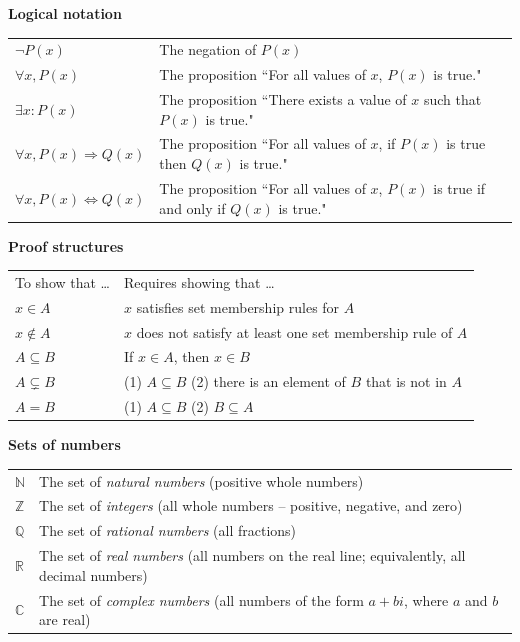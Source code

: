 \documentclass[11pt]{article}
\newcommand{\R}{\mathbb{R}}
\newcommand{\C}{\mathbb{C}}
\newcommand{\Q}{\mathbb{Q}}
\newcommand{\N}{\mathbb{N}}
\newcommand{\Z}{\mathbb{Z}}
\renewcommand\subset\subseteq
\theoremstyle{definition}
\begin{document}
\vfill 
{\bf Logical notation}

\begin{tabular}{L{1in}L{5in}}
$\neg P(x)$ & The negation of $P(x)$ \\

$\forall x, P(x)$ & The proposition ``For all values of $x$, $P(x)$ is true." \\

$\exists x: P(x)$ & The proposition ``There exists a value of $x$ such that $P(x)$ is true." \\

$\forall x, P(x) \Rightarrow Q(x)$ & The proposition ``For all values of $x$, if $P(x)$ is true then $Q(x)$ is true."\\

$\forall x, P(x) \Leftrightarrow Q(x)$ & The proposition ``For all values of $x$, $P(x)$ is true if and only if $Q(x)$ is true." 
\end{tabular}


\vfill
{\bf Proof structures}

\begin{tabular}{L{1in}L{5in}}
To show that \dots & Requires showing that \dots \\
{\bf $x\in A$} & $x$ satisfies set membership rules for $A$ \\
{\bf $x\notin A$} & $x$ does not satisfy at least one set membership rule of $A$ \\ 
{\bf $A\subset B$} & If $x\in A$, then $x\in B$ \\ 
{\bf $A\subsetneq B$} & (1) $A\subset B$ \quad (2) there is an element of $B$ that is not in $A$ \\ 
{\bf $A=B$} & (1) $A\subset B$ \quad (2) $B\subset A$
\end{tabular}

\vfill 

{\bf Sets of numbers}

\begin{tabular}{ll}
$\N$ & The set of {\em natural numbers} (positive whole numbers) \\
$\Z$ & The set of {\em integers} (all whole numbers -- positive, negative, and zero) \\
$\Q$ & The set of {\em rational numbers} (all fractions) \\
$\R$ & The set of {\em real numbers} (all numbers on the real line; equivalently, all decimal numbers) \\
$\C$ & The set of {\em complex numbers} (all numbers of the form $a+bi$, where $a$ and $b$ are real)
\end{tabular}
\end{document}

